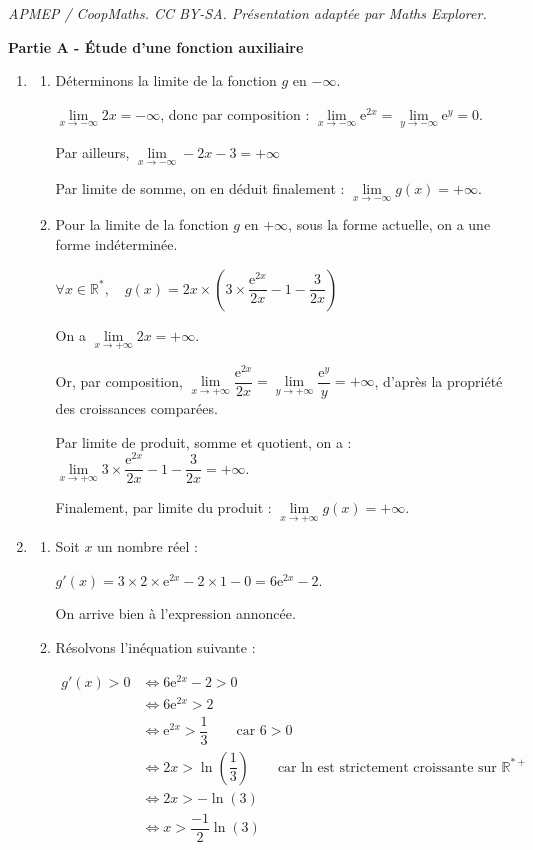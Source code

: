 \documentclass[10pt]{article}
\providecommand{\R}{\mathbb{R}}
\providecommand{\e}{{\mathrm{e}}}
\begin{document}
\noindent\textit{APMEP / CoopMaths. CC BY-SA. Présentation adaptée par Maths Explorer.}\par\medskip
\medskip

\textbf{Partie A - Étude d'une fonction auxiliaire}

\medskip

\begin{enumerate}
\item 
	\begin{enumerate}
		\item Déterminons la limite de la fonction $g$ en $-\infty$.

$\lim\limits_{x \to -\infty} 2x = -\infty$, donc par composition : $\lim\limits_{x \to -\infty} \e^{2x} = \lim\limits_{y \to -\infty} \e^{y} = 0$.

Par ailleurs, $\lim\limits_{x \to -\infty} -2x - 3 = +\infty$

Par limite de somme, on en déduit finalement : $\lim\limits_{x \to -\infty} g(x) = +\infty$.

		\item Pour la limite de la fonction $g$ en $+\infty$, sous la forme actuelle, on a une forme indéterminée.

$\forall x \in \R^*, \quad g(x) = 2x \times \left(3 \times \dfrac{\e^{2x}}{2x} - 1 - \dfrac{3}{2x}\right)$

On a $\lim\limits_{x \to +\infty} 2x = +\infty$.

Or, par composition, $\lim\limits_{x \to +\infty} \dfrac{\e^{2x}}{2x} = \lim\limits_{y \to +\infty} \dfrac{\e^y}{y} = +\infty$, d'après la propriété des croissances comparées.

Par limite de produit, somme et quotient, on a : $\lim\limits_{x \to +\infty} 3\times \dfrac{\e^{2x}}{2x} - 1 - \dfrac{3}{2x} = +\infty$.

Finalement, par limite du produit : $\lim\limits_{x \to +\infty}g(x) = +\infty$.
	\end{enumerate}
\item 
	\begin{enumerate}
		\item Soit $x$ un nombre réel :

$g'(x) = 3 \times 2 \times \e^{2x} - 2\times 1 - 0 = 6 \mathrm{e}^{2 x}-2$.

On arrive bien à l'expression annoncée.

		\item Résolvons l'inéquation suivante :

$\begin{aligned} g'(x) > 0 &\iff 6\e^{2x}-2 > 0\\
&\iff 6\e^{2x} > 2\\
&\iff \e^{2x} > \dfrac{1}{3} \qquad \text{car }6 > 0\\
&\iff 2x > \ln\left(\dfrac{1}{3}\right) \qquad \text{car ln est strictement croissante sur } \R^{*+}\\
&\iff 2x > -\ln(3)\\
&\iff x > \dfrac{-1}{2}\ln(3)
\\ \end{aligned}$


\end{enumerate}
\end{enumerate}
\end{document}
